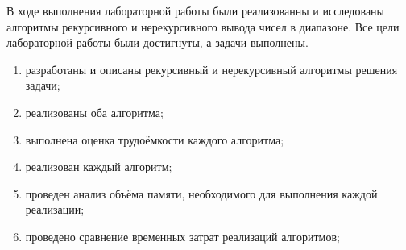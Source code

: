 
В ходе выполнения лабораторной работы были реализованны и исследованы алгоритмы рекурсивного и нерекурсивного вывода чисел в диапазоне. Все цели лабораторной работы были достигнуты, а задачи выполнены.
\begin{enumerate}
	\item разработаны и описаны рекурсивный и нерекурсивный алгоритмы решения задачи;
	\item реализованы оба алгоритма;
	\item выполнена оценка трудоёмкости каждого алгоритма;
	\item реализован каждый алгоритм;
	\item проведен анализ объёма памяти, необходимого для выполнения каждой реализации;
	\item проведено сравнение временных затрат реализаций алгоритмов;
\end{enumerate}
